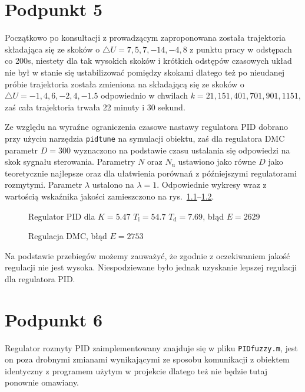 \chapter{Podpunkt 5}
Początkowo po konsultacji z prowadzącym zaproponowana została trajektoria składająca się ze skoków o $\triangle U={7, 5, 7, -14, -4, 8}$ z punktu pracy w odstępach co 200s, niestety dla tak wysokich skoków i krótkich odstępów czasowych układ nie był w stanie się ustabilizować pomiędzy skokami dlatego też po nieudanej próbie trajektoria została zmieniona na składającą się ze skoków o $\triangle U={-1, 4, 6, -2, 4, \num{-1.5}}$ odpowiednio w chwilach $k={21, 151, 401, 701, 901, 1151}$, zaś cała trajektoria trwała 22 minuty i 30 sekund.

Ze względu na wyraźne ograniczenia czasowe nastawy regulatora PID dobrano przy użyciu narzędzia \verb+pidtune+ na symulacji obiektu, zaś dla regulatora DMC parametr $D=300$ wyznaczono na podstawie czasu ustalania się odpowiedzi na skok sygnału sterowania. Parametry $ N $ oraz $ N_\mathrm{u} $ ustawiono jako równe $ D $ jako teoretycznie najlepsze oraz dla ułatwienia porównań z późniejszymi regulatorami rozmytymi. Parametr $ \lambda $ ustalono na $\lambda=1$. Odpowiednie wykresy wraz z wartością wskaźnika jakości zamieszczono na rys.~\ref{R7}--\ref{R8}.

\begin{figure}[H]
\centering

\caption{Regulator PID dla $K=\num{5.47}$ $T_{\mathrm{i}}=\num{54.7}$ $T_{\mathrm{d}}=\num{7.69}$, błąd $E=2629$}
\label{R7}
\end{figure}

\begin{figure}[H]
\centering

\caption{Regulacja DMC, błąd $E=2753$}
\label{R8}
\end{figure}

Na podstawie przebiegów możemy zauważyć, że zgodnie z oczekiwaniem jakość regulacji nie jest wysoka. Niespodziewane było jednak uzyskanie lepszej regulacji dla regulatora PID\@.

\chapter{Podpunkt 6}
Regulator rozmyty PID zaimplementowany znajduje się w pliku \verb+PIDfuzzy.m+, jest on poza drobnymi zmianami wynikającymi ze sposobu komunikacji z obiektem identyczny z programem użytym w projekcie dlatego też nie będzie tutaj ponownie omawiany.

